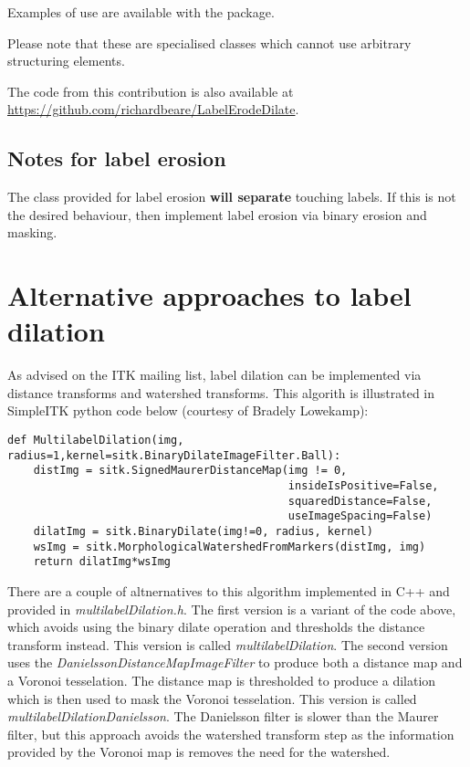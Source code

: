 \documentclass{InsightArticle}
\begin{document}
Examples of use are available with the package.

Please note that these are specialised classes which cannot use
arbitrary structuring elements.

The code from this contribution is also available at
\url{https://github.com/richardbeare/LabelErodeDilate}.

\subsection{Notes for label erosion}
The class provided for label erosion {\bf will separate} touching
labels. If this is not the desired behaviour, then implement label
erosion via binary erosion and masking.

\section{Alternative approaches to label dilation}
As advised on the ITK mailing list, label dilation can be implemented
via distance transforms and watershed transforms. This algorith is
illustrated in SimpleITK python code below (courtesy of Bradely
Lowekamp):

\lstset{language=Python}
\begin{lstlisting}
def MultilabelDilation(img, radius=1,kernel=sitk.BinaryDilateImageFilter.Ball):
    distImg = sitk.SignedMaurerDistanceMap(img != 0,
                                           insideIsPositive=False, 
                                           squaredDistance=False, 
                                           useImageSpacing=False)
    dilatImg = sitk.BinaryDilate(img!=0, radius, kernel)
    wsImg = sitk.MorphologicalWatershedFromMarkers(distImg, img)
    return dilatImg*wsImg
\end{lstlisting}

There are a couple of altnernatives to this algorithm implemented in
C++ and provided in {\em multilabelDilation.h}. The first version is a
variant of the code above, which avoids using the binary dilate
operation and thresholds the distance transform instead. This version
is called {\em multilabelDilation}. The second version uses the {\em
DanielssonDistanceMapImageFilter} to produce both a distance map and a
Voronoi tesselation. The distance map is thresholded to produce a
dilation which is then used to mask the Voronoi tesselation. This
version is called {\em multilabelDilationDanielsson}. The Danielsson
filter is slower than the Maurer filter, but this approach avoids the
watershed transform step as the information provided by the Voronoi
map is removes the need for the watershed.
\end{document}
